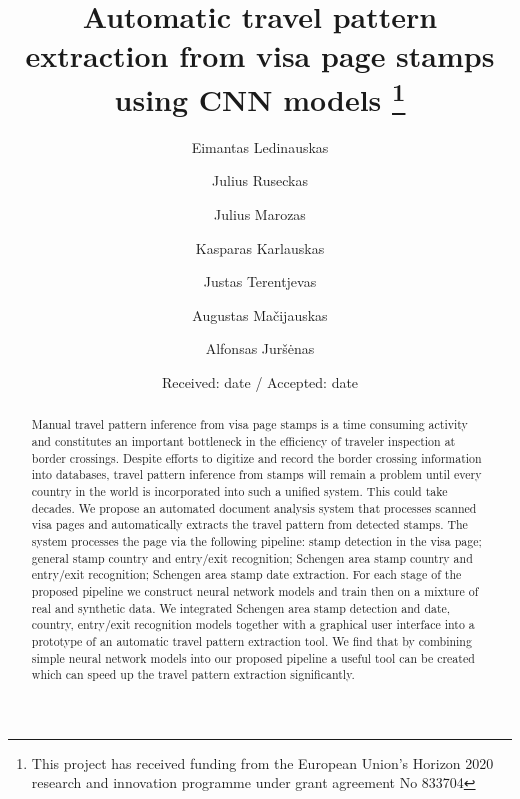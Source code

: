 \documentclass[twocolumn]{svjour3}
\begin{document}
\title{Automatic travel pattern extraction from visa page stamps using CNN models
\thanks{This project has received funding from the European Union’s Horizon 2020 research and innovation programme under grant agreement No 833704}
}


\author{Eimantas Ledinauskas  \and
        Julius Ruseckas       \and
        Julius Marozas        \and
        Kasparas Karlauskas   \and
        Justas Terentjevas    \and
        Augustas Mačijauskas  \and
        Alfonsas Juršėnas
}


\date{Received: date / Accepted: date}

\maketitle

\begin{abstract}
Manual travel pattern inference from visa page stamps is a time consuming activity and constitutes an important bottleneck in the efficiency of traveler inspection at border crossings. Despite efforts to digitize and record the border crossing information into databases, travel pattern inference from stamps will remain a problem until every country in the world is incorporated into such a unified system. This could take decades.
We propose an automated document analysis system
that processes scanned visa pages and automatically extracts the travel pattern from detected stamps. The system processes the page via the following pipeline:
stamp detection in the visa page;
general stamp country and entry/exit recognition;
Schengen area stamp country and entry/exit recognition;
Schengen area stamp date extraction.
For each stage of the proposed pipeline we construct neural network models and train then on a mixture of real and synthetic data. We integrated Schengen area stamp detection and date, country, entry/exit recognition models together with a graphical user interface into a prototype of an automatic travel pattern extraction tool. We find that by combining simple neural network models into our proposed pipeline a useful tool can be created which can speed up the travel pattern extraction significantly.
\end{abstract}
\end{document}
